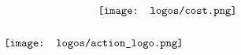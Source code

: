 \thispagestyle{empty}
\begin{center}
\begin{minipage}{0.75\linewidth}
    \centering
        \vspace{3cm}
\centering
\begin{align*}
&\hspace{3cm}\texttt{[image: logos/cost.png]}
\\
\vspace{5cm}
\\
&\texttt{[image: logos/action\_logo.png]}
\end{align*}
\vfill
\end{minipage}
\begin{minipage}{0.75\linewidth}
\maketitle

\end{minipage}
\end{center}
\clearpage
